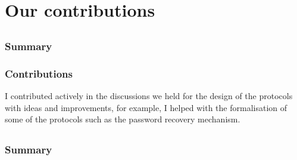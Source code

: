 \documentclass[showtrims, oldfontcommands]{kthesis}
\begin{document}
\chapter{Our contributions}
    \label{chapter:our-contributions}
\renewcommand\thesection{\Alph{section}}
\section{}
\begingroup\centering
\begin{ppBox}
\end{ppBox}
\endgroup

\subsection{Summary}


\subsection{Contributions}
    \label{subsection:contributions-p2p}
I contributed actively in the discussions we held for the design of the protocols 
with ideas and improvements, for example, I helped with the formalisation of some 
of the protocols such as the password recovery mechanism. 


\section{}
\begingroup\centering
\begin{ppBox}
\end{ppBox}
\endgroup

\subsection{Summary}
\end{document}
